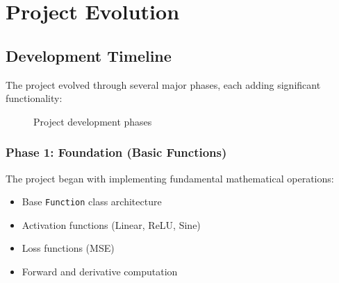\documentclass[12pt,a4paper]{article}
\begin{document}
\section{Project Evolution}

\subsection{Development Timeline}

The project evolved through several major phases, each adding significant functionality:

\begin{figure}[h]
\centering
{}
\caption{Project development phases}
\end{figure}

\subsubsection{Phase 1: Foundation (Basic Functions)}

The project began with implementing fundamental mathematical operations:
\begin{itemize}
    \item Base \texttt{Function} class architecture
    \item Activation functions (Linear, ReLU, Sine)
    \item Loss functions (MSE)
    \item Forward and derivative computation
\end{itemize}
\end{document}
